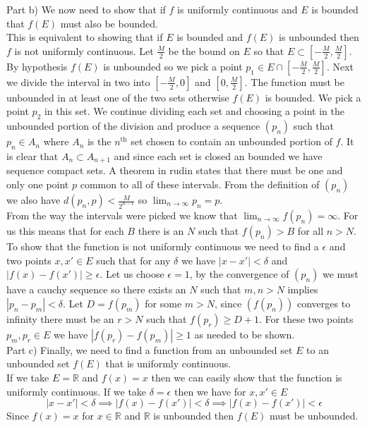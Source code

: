 \documentclass[11pt,reqno]{article}
\begin{document}
\noindent Part b) We now need to show that if $f$ is uniformly continuous and $E$ is bounded that $f(E)$ must also be bounded.\\
\indent This is equivalent to showing that if $E$ is bounded and $f(E)$ is unbounded then $f$ is not uniformly continuous. Let $\frac{M}{2}$ be the bound on $E$ so that $E \subset [-\frac{M}{2},\frac{M}{2}]$. By hypothesis $f(E)$ is unbounded so we pick a point $p_1 \in E \cap  [-\frac{M}{2},\frac{M}{2}]$. Next we divide the interval in two into $ [-\frac{M}{2},0]$ and $[0,\frac{M}{2}]$. The function must be unbounded in at least one of the two sets otherwise $f(E)$ is bounded. We pick a point $p_2$ in this set. We continue dividing each set and choosing a point in the unbounded portion of the division and produce a sequence $(p_n)$ such that $p_n \in A_n$ where $A_n$ is the $n^\text{th}$ set chosen to contain an unbounded portion of $f$. It is clear that $A_n \subset A_{n+1}$ and since each set is closed an bounded we have sequence compact sets. A theorem in rudin states that there must be one and only one point $p$ common to all of these intervals. From the definition of $(p_n)$ we also have $d(p_n,p) < \frac{M}{2^{n-1}}$ so $\lim_{n \to \infty} p_n = p$.\\
\indent From the way the intervals were picked we know that $\lim_{n \to \infty} f(p_n) = \infty$. For us this means that for each $B$ there is an $N$ such that $f(p_n) > B$ for all $n > N$. To show that the function is not uniformly continuous we need to find a $\epsilon$ and two points $x,x' \in E$ such that for any $\delta$ we have $|x-x'| < \delta$ and $|f(x)-f(x')| \ge \epsilon$. Let us choose $\epsilon = 1$, by the convergence of $(p_n)$ we must have a cauchy sequence so there exists an $N$ such that $m,n > N$ implies $|p_n-p_m| < \delta$. Let $D = f(p_m)$ for some $m > N$, since $(f(p_n))$ converges to infinity there must be an $r > N$ such that $f(p_r) \ge D+1$. For these two points $p_m,p_r \in E$ we have $|f(p_r)-f(p_m)| \ge 1$ as needed to be shown.\\
 
\noindent Part c) Finally, we need to find a function from an unbounded set $E$ to an unbounded set $f(E)$ that is uniformly continuous.\\
\indent If we take $E= \mathbb{R}$ and $f(x) = x$ then we can easily show that the function is uniformly continuous. If we take $\delta = \epsilon$ then we have for $x,x' \in E$
\[ |x-x'| < \delta \implies |f(x)-f(x')| < \delta \implies |f(x)-f(x')| < \epsilon \]
Since $f(x) = x$ for $x \in \mathbb{R}$ and $\mathbb{R}$ is unbounded then $f(E)$ must be unbounded.
\end{document}
